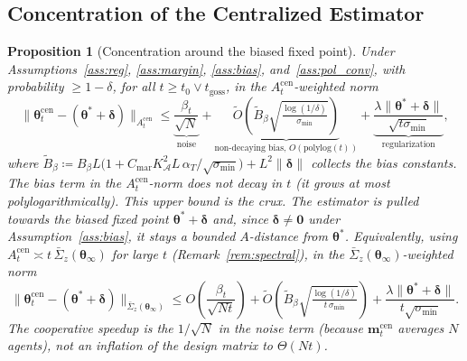 \documentclass[11pt]{article}
\newtheorem{proposition}[theorem]{Proposition}
\newcommand{\Ot}{\widetilde{O}}
\begin{document}
\subsection{Concentration of the Centralized Estimator}

\begin{proposition}[Concentration around the biased fixed point]
\label{prop:conc}
Under Assumptions~\ref{ass:reg}, \ref{ass:margin}, \ref{ass:bias},
and~\ref{ass:pol_conv}, with probability $\geq 1-\delta$,
for all $t\geq t_0\vee t_{\mathrm{goss}}$, in the
$A_t^{\mathrm{cen}}$-weighted norm \begin{equation}
\|\bm{\theta}_t^{\mathrm{cen}}-(\bm{\theta}^{\!*}+\bm{\delta})\|_{A_t^{\mathrm{cen}}}
\leq\underbrace{\frac{\beta_t}{\sqrt{N}}}_{\text{noise}}
+\underbrace{\Ot\!\left(\widetilde B_\beta
\sqrt{\tfrac{\log(1/\delta)}{\sigma_{\min}}}\right)}_{\text{non-decaying bias, }O(\mathrm{polylog}(t))}
+\underbrace{\frac{\lambda\|\bm{\theta}^{\!*}+\bm{\delta}\|}{\sqrt{t\sigma_{\min}}}}_{\text{regularization}},
\label{eq:conc}
\end{equation}
where
$\widetilde B_\beta\coloneqq
B_\beta L\bigl(1+C_{\mathrm{mar}}K_{\mathcal{A}}^2 L\,
\alpha_T/\sqrt{\sigma_{\min}}\bigr)
+L^2\|\bm\delta\|$
collects the bias constants.  The bias term in the
$A_t^{\mathrm{cen}}$-norm does \emph{not} decay in $t$ (it grows at
most polylogarithmically). This upper bound is the crux. The estimator
is pulled towards the biased fixed point $\bm\theta^{\!*}+\bm\delta$
and, since $\bm\delta\neq\bm 0$ under Assumption~\ref{ass:bias}, it
stays a bounded $A$-distance from $\bm\theta^{\!*}$.
Equivalently, using $A_t^{\mathrm{cen}}\asymp
t\,\bar{\Sigma}_z(\bm{\theta}_\infty)$ for large $t$
(Remark~\ref{rem:spectral}), in the
$\bar{\Sigma}_z(\bm{\theta}_\infty)$-weighted norm
\begin{equation}
\|\bm{\theta}_t^{\mathrm{cen}}-(\bm{\theta}^{\!*}+\bm{\delta})\|_{\bar{\Sigma}_z(\bm{\theta}_\infty)}
\leq O\!\left(\frac{\beta_t}{\sqrt{N t}}\right)
+\Ot\!\left(\widetilde B_\beta\sqrt{\tfrac{\log(1/\delta)}{t\,\sigma_{\min}}}\right)
+\frac{\lambda\|\bm{\theta}^{\!*}+\bm{\delta}\|}{t\sqrt{\sigma_{\min}}}.
\label{eq:conc_sigma}
\end{equation}
The cooperative speedup is the $1/\sqrt N$ in the noise term
(because $\bm{m}_t^{\mathrm{cen}}$ averages $N$ agents),
\emph{not} an inflation of the design matrix to $\Theta(Nt)$.
\end{proposition}
\end{document}

